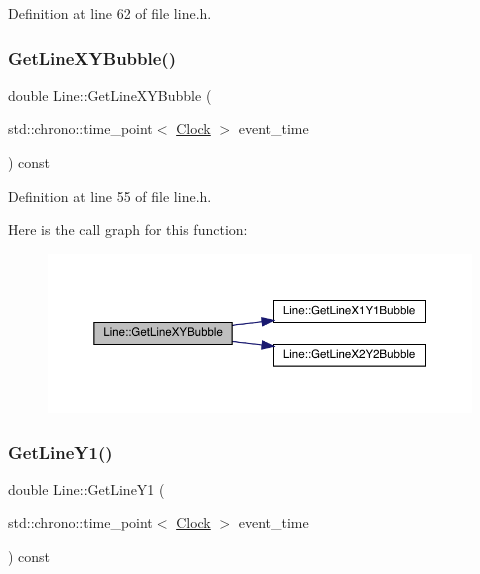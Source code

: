 Definition at line 62 of file line.\+h.

\mbox{\label{class_line_a8752cfce7330fbeda936778b77e534d0}} 
\subsubsection{\texorpdfstring{Get\+Line\+X\+Y\+Bubble()}{GetLineXYBubble()}}
{\footnotesize\ttfamily double Line\+::\+Get\+Line\+X\+Y\+Bubble (\begin{DoxyParamCaption}\item[{std\+::chrono\+::time\+\_\+point$<$ \hyperlink{universe_8h_a0ef8d951d1ca5ab3cfaf7ab4c7a6fd80}{Clock} $>$}]{event\+\_\+time }\end{DoxyParamCaption}) const\hspace{0.3cm}{\ttfamily [inline]}}



Definition at line 55 of file line.\+h.

Here is the call graph for this function\+:\nopagebreak
\begin{figure}[H]
\begin{center}
\leavevmode
\includegraphics[width=350pt]{class_line_a8752cfce7330fbeda936778b77e534d0_cgraph}
\end{center}
\end{figure}
\mbox{\label{class_line_ac09a53b36a300c38191269f110c73eb1}} 
\subsubsection{\texorpdfstring{Get\+Line\+Y1()}{GetLineY1()}}
{\footnotesize\ttfamily double Line\+::\+Get\+Line\+Y1 (\begin{DoxyParamCaption}\item[{std\+::chrono\+::time\+\_\+point$<$ \hyperlink{universe_8h_a0ef8d951d1ca5ab3cfaf7ab4c7a6fd80}{Clock} $>$}]{event\+\_\+time }\end{DoxyParamCaption}) const\hspace{0.3cm}{\ttfamily [inline]}}



